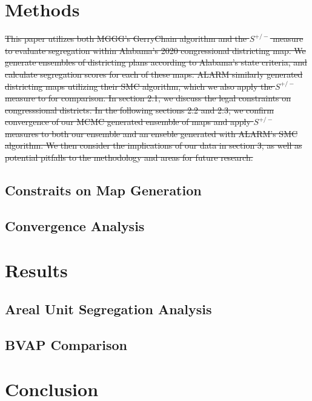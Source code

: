 \documentclass{article}
\begin{document}
\section{Methods}\label{methods}
\st{This paper utilizes both MGGG's GerryChain algorithm and the $S^{+/-}$ measure to evaluate segregation within Alabama's 2020 congressional districting map. We generate ensembles of districting plans according to Alabama's state criteria, and calculate segregation scores for each of these maps. ALARM similarly generated districting maps utilizing their SMC algorithm, which we also apply the $S^{+/-}$ measure to for comparison. In section 2.1, we discuss the legal constraints on congresssional districts. In the following sections 2.2 and 2.3, we confirm convergence of our MCMC generated ensemble of maps and apply $S^{+/-}$ measures to both our ensemble and an enseble generated with ALARM's SMC algorithm. We then consider the implications of our data in section 3, as well as potential pitfalls to the methodology and areas for future research.}

\subsection{Constraits on Map Generation}\label{constraints}

\subsection{Convergence Analysis}\label{convergence}

\section{Results}\label{results}

\subsection{Areal Unit Segregation Analysis}

\subsection{BVAP Comparison}

\section{Conclusion}
\end{document}
